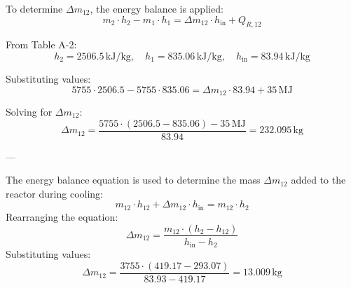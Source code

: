 To determine \( \Delta m_{12} \), the energy balance is applied:  
\[
m_2 \cdot h_2 - m_1 \cdot h_1 = \Delta m_{12} \cdot h_{\text{in}} + Q_{R,12}
\]  

From Table A-2:  
\[
h_2 = 2506.5 \, \text{kJ/kg}, \quad h_1 = 835.06 \, \text{kJ/kg}, \quad h_{\text{in}} = 83.94 \, \text{kJ/kg}
\]  

Substituting values:  
\[
5755 \cdot 2506.5 - 5755 \cdot 835.06 = \Delta m_{12} \cdot 83.94 + 35 \, \text{MJ}
\]  

Solving for \( \Delta m_{12} \):  
\[
\Delta m_{12} = \frac{5755 \cdot (2506.5 - 835.06) - 35 \, \text{MJ}}{83.94} = 232.095 \, \text{kg}
\]  

---

The energy balance equation is used to determine the mass \( \Delta m_{12} \) added to the reactor during cooling:  
\[
m_{12} \cdot h_{12} + \Delta m_{12} \cdot h_{\text{in}} = m_{12} \cdot h_{2}
\]  
Rearranging the equation:  
\[
\Delta m_{12} = \frac{m_{12} \cdot (h_{2} - h_{12})}{h_{\text{in}} - h_{2}}
\]  
Substituting values:  
\[
\Delta m_{12} = \frac{3755 \cdot (419.17 - 293.07)}{83.93 - 419.17} = 13.009 \, \text{kg}
\]
